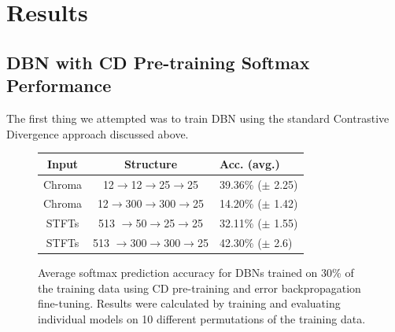 \documentclass{article}
\begin{document}
\section{Results}
\label{sec:results}

\subsection{DBN with CD Pre-training Softmax Performance}

The first thing we attempted was to train DBN using the standard Contrastive
Divergence approach discussed above. 

\begin{figure}
\begin{center}
\begin{tabular}{c|c|l}
Input & Structure & Acc. (avg.) \\
\hline
Chroma & 12$\rightarrow$12$\rightarrow$25$\rightarrow$25 & 39.36\% ($\pm$ 2.25) \\
Chroma & 12$\rightarrow$300$\rightarrow$300$\rightarrow$25 & 14.20\% ($\pm$ 1.42) \\
STFTs & 513 $\rightarrow$50$\rightarrow$25$\rightarrow$25 & 32.11\% ($\pm$ 1.55) \\
STFTs & 513 $\rightarrow$300$\rightarrow$300$\rightarrow$25 & 42.30\% ($\pm$ 2.6) \\
\end{tabular}
\label{fig:dbn:softmax}
\end{center}

\caption{Average softmax prediction accuracy for DBNs trained on 30\% of the
training data using CD pre-training and error backpropagation fine-tuning.
Results were calculated by training and evaluating individual models on 10
different permutations of the training data.}

\end{figure}
\end{document}
